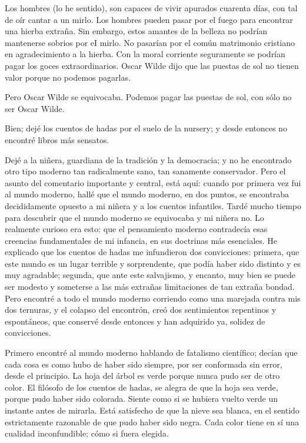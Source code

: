 Los hombres (lo he sentido), son capaces de vivir apurados cuarenta días, con tal de oír cantar a un
mirlo. Los hombres pueden pasar por el fuego para encontrar una hierba extraña. Sin embargo, estos
amantes de la belleza no podrían mantenerse sobrios por eI mirlo. No pasarían por el común matrimonio
cristiano en agradecimiento a la hierba. Con la moral corriente seguramente se podrían pagar los goces
extraordinarios. Oscar Wilde dijo que las puestas de sol no tienen valor porque no podemos pagarlas.

Pero Oscar Wilde se equivocaba. Podemos pagar las puestas de sol, con sólo no ser Oscar Wilde.

Bien; dejé los cuentos de hadas por el suelo de la nursery; y desde entonces no encontré libros más
sensatos.

Dejé a la niñera, guardiana de la tradición y la democracia; y no he encontrado otro tipo moderno
tan radicalmente sano, tan sanamente conservador. Pero el asunto del comentario importante y central,
está aquí: cuando por primera vez fui al mundo moderno, hallé que el mundo moderno, en dos puntos, se
encontraba decididamente opuesto a mi niñera y a los cuentos infantiles. Tardé mucho tiempo para
descubrir que el mundo moderno se equivocaba y mi niñera no. Lo realmente curioso era esto: que el
pensamiento moderno contradecía esas creencias fundamentales de mi infancia, en sus doctrinas más
esenciales. He explicado que los cuentos de hadas me infundieron dos convicciones: primera, que este
mundo es un lugar terrible y sorprendente, que podía haber sido distinto y es muy agradable; segunda, que
ante este salvajismo, y encanto, muy bien se puede ser modesto y someterse a las más extrañas
limitaciones de tan extraña bondad. Pero encontré a todo el mundo moderno corriendo como una
marejada contra mis dos ternuras, y el colapso del encontrón, creó dos sentimientos repentinos y
espontáneos, que conservé desde entonces y han adquirido ya, solidez de convicciones.

Primero encontré al mundo moderno hablando de fatalismo científico; decían que cada cosa es
como hubo de haber sido siempre, por ser conformada sin error, desde el principio. La hoja del árbol es
verde porque nunca pudo ser de otro color. El filósofo de los cuentos de hadas, se alegra de que la hoja
sea verde, porque pudo haber sido colorada. Siente como si se hubiera vuelto verde un instante antes de
mirarla. Está satisfecho de que la nieve sea blanca, en el sentido estrictamente razonable de que pudo
haber sido negra. Cada color tiene en sí una cualidad inconfundible; cómo si fuera elegida.


